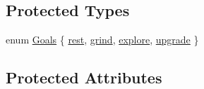 \subsection*{Protected Types}
\begin{DoxyCompactItemize}
\item 
enum \hyperlink{class_mob_a886346a9f913203df0797f2c84dd8962}{Goals} \{ \hyperlink{class_mob_a886346a9f913203df0797f2c84dd8962a3d18c0a90658cc4872eed0afe28790b4}{rest}, 
\hyperlink{class_mob_a886346a9f913203df0797f2c84dd8962aa72b321b37507255070e236e133616f9}{grind}, 
\hyperlink{class_mob_a886346a9f913203df0797f2c84dd8962a114d85e85d882dd8bf2be34208450b6c}{explore}, 
\hyperlink{class_mob_a886346a9f913203df0797f2c84dd8962ac9be3f62a039d2a4c5a63146a03a307d}{upgrade}
 \}
\end{DoxyCompactItemize}
\subsection*{Protected Attributes}
